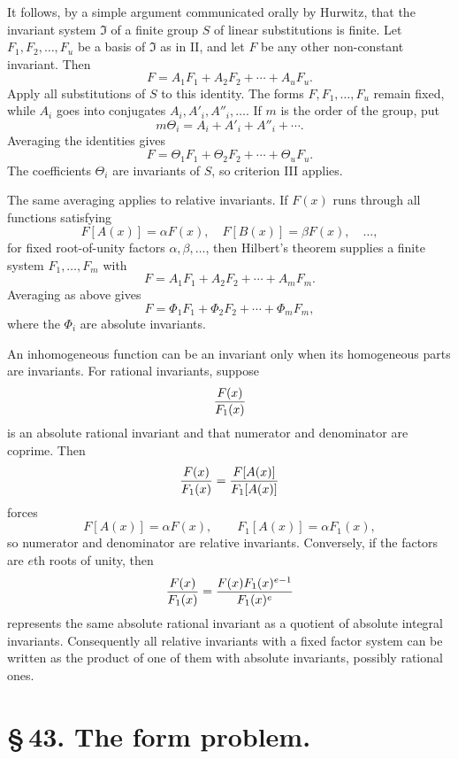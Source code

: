 \documentclass[11pt]{article}
\begin{document}
It follows, by a simple argument communicated orally by Hurwitz, that the invariant system $\mathfrak I$ of a finite group $S$ of linear substitutions is finite. Let $F_1,F_2,\ldots,F_u$ be a basis of $\mathfrak I$ as in II, and let $F$ be any other non-constant invariant. Then
\begin{equation}
F=A_1F_1+A_2F_2+\cdots+A_uF_u.
\tag{2}
\end{equation}
Apply all substitutions of $S$ to this identity. The forms $F,F_1,\ldots,F_u$ remain fixed, while $A_i$ goes into conjugates $A_i,A'_i,A''_i,\ldots$. If $m$ is the order of the group, put
\begin{equation}
m\Theta_i=A_i+A'_i+A''_i+\cdots.
\tag{3}
\end{equation}
Averaging the identities gives
\begin{equation}
F=\Theta_1F_1+\Theta_2F_2+\cdots+\Theta_uF_u.
\tag{4}
\end{equation}
The coefficients $\Theta_i$ are invariants of $S$, so criterion III applies.

The same averaging applies to relative invariants. If $F(x)$ runs through all functions satisfying
\[
F[A(x)]=\alpha F(x),
\quad F[B(x)]=\beta F(x),
\quad\ldots,
\]
for fixed root-of-unity factors $\alpha,\beta,\ldots$, then Hilbert's theorem supplies a finite system $F_1,\ldots,F_m$ with
\begin{equation}
F=A_1F_1+A_2F_2+\cdots+A_mF_m.
\tag{5}
\end{equation}
Averaging as above gives
\[
F=\Phi_1F_1+\Phi_2F_2+\cdots+\Phi_mF_m,
\]
where the $\Phi_i$ are absolute invariants.

An inhomogeneous function can be an invariant only when its homogeneous parts are invariants. For rational invariants, suppose
\[
{F(x)\over F_1(x)}
\]
is an absolute rational invariant and that numerator and denominator are coprime. Then
\[
{F(x)\over F_1(x)}={F[A(x)]\over F_1[A(x)]}
\]
forces
\[
F[A(x)]=\alpha F(x),
\qquad
F_1[A(x)]=\alpha F_1(x),
\]
so numerator and denominator are relative invariants. Conversely, if the factors are $e$th roots of unity, then
\[
{F(x)\over F_1(x)}={F(x)F_1(x)^{e-1}\over F_1(x)^e}
\]
represents the same absolute rational invariant as a quotient of absolute integral invariants. Consequently all relative invariants with a fixed factor system can be written as the product of one of them with absolute invariants, possibly rational ones.

\section*{\S\,43. The form problem.}
\end{document}
